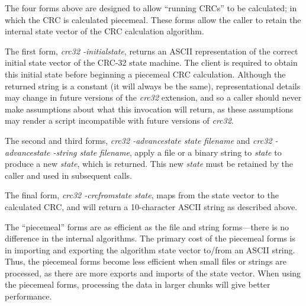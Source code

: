 \begin{tclcommanddescription}
\begin{tclcommandinternaldescription}{%
                                     }
The four forms above are designed to allow ``running CRCs'' to be calculated; in which
the CRC is calculated piecemeal.  These forms allow the caller to retain the internal
state vector of the CRC calculation algorithm.

The first form, \emph{crc32 -initialstate}, returns an ASCII representation of the
correct initial state vector of the CRC-32 state machine.  The client is required
to obtain this initial state before beginning a piecemeal CRC calculation.  Although the
returned string is a constant (it will always be the same), representational details
may change in future versions of the \emph{crc32} extension, and so a caller should never
make assumptions about what this invocation will return, as these assumptions may 
render a script incompatible with future versions of \emph{crc32}.

The second and third forms, \emph{crc32 -advancestate state filename}
and \emph{crc32 -advancestate -string state filename}, apply a file or a binary string
to \emph{state} to produce a new \emph{state}, which is returned.  This new \emph{state}
must be retained by the caller and used in subsequent calls.

The final form, \emph{crc32 -crcfromstate state}, maps from the state vector to the 
calculated CRC, and will return a 10-character ASCII string as described above.
\end{tclcommandinternaldescription}

\end{tclcommanddescription}


\begin{tclcommandusagenotes}
The ``piecemeal'' forms are as efficient as the file and string forms---there is no difference
in the internal algorithms.  The primary cost of the piecemeal forms is in importing and 
exporting the algorithm state vector to/from an ASCII string.  
Thus, the piecemeal forms become less efficient when
small files or strings are processed, as there are more exports and imports
of the state vector.  When using the piecemeal forms, processing the data in 
larger chunks will give better performance.
\end{tclcommandusagenotes}


